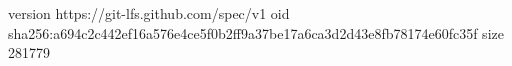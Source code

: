 version https://git-lfs.github.com/spec/v1
oid sha256:a694c2c442ef16a576e4ce5f0b2ff9a37be17a6ca3d2d43e8fb78174e60fc35f
size 281779
